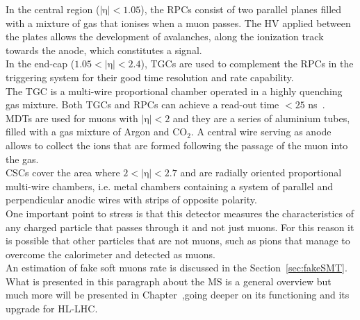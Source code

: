 \vspace{\baselineskip}
In the central region ($\mathrm {|\eta | <1.05}$), the RPCs consist of two parallel planes filled with a mixture of gas that ionises when a muon passes.
The HV applied between the plates allows the development of avalanches, along the ionization track towards the anode, which constitutes a signal.\\
In the end-cap ($\mathrm {1.05<|\eta |<2.4}$), TGCs are used to complement the RPCs in the triggering system for their good time resolution and rate capability. 
\\The TGC is a multi-wire proportional chamber operated in a highly quenching gas mixture.
Both TGCs and RPCs can achieve a read-out time $\mathrm {<25}$ ns~\cite{MS}.
\vspace{\baselineskip}
\\MDTs are used for muons with $\mathrm {|\eta | <2} $ and they are a series of aluminium tubes, filled with a gas mixture of Argon and $\mathrm {CO_2}$.
A central wire serving as anode allows to collect the ions that are formed following the passage of the muon into the gas.
\\CSCs cover the area where $ \mathrm {2 <| \eta | <2.7} $ and are radially oriented proportional multi-wire chambers, i.e. metal chambers containing a system of parallel and perpendicular 
anodic wires with strips of opposite polarity.
\vspace{\baselineskip}
\\One important point to stress is that this detector measures the characteristics of any charged particle that passes through it and not just muons.
For this reason it is possible that other particles that are not muons, such as pions that manage to overcome the calorimeter and detected as muons.\\
An estimation of fake soft muons rate is discussed in the Section~\ref{sec:fakeSMT}.
What is presented in this paragraph about the MS is a general overview but much more will be presented in Chapter~\label{chapter:upgrade},going deeper on its functioning
and its upgrade for HL-LHC.

\FloatBarrier
